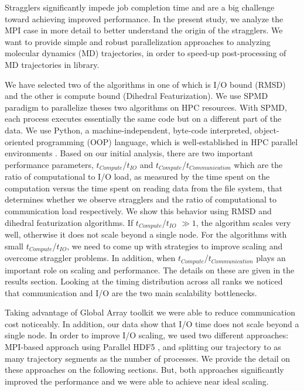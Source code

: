 Stragglers significantly impede job completion time and are a big challenge toward achieving improved performance.
In the present study, we analyze the MPI case in more detail to better understand the origin of the stragglers.
We want to provide simple and robust parallelization approaches to analyzing molecular dynamics (MD) trajectories, in order to speed-up post-processing of MD trajectories in  library. 

We have selected two of the algorithms in  one of which is I/O bound (RMSD) and the other is compute bound (Dihedral Featurization).
We use SPMD paradigm to parallelize theses two algorithms on HPC resources.
With SPMD, each process executes essentially the same code but on a different part of the data. 
We use Python, a machine-independent, byte-code interpreted, object-oriented programming (OOP) language, which is well-established in HPC parallel environments \cite{GAiN}. 
Based on our initial analysis, there are two important performance parameters,  $t_{Compute}$/$t_{IO}$ and $t_{Compute}$/$t_{Communication}$ which are the ratio of computational to I/O load, as measured by the time spent on the computation versus the time spent on reading data from the file system, that determines whether we observe stragglers and the ratio of computational to communication load respectively.
We show this behavior using RMSD and dihedral featurization algorithms.
If $t_{Compute}$/$t_{IO}$  $\gg 1$, the algorithm scales very well, otherwise it does not scale beyond a single node.  
For the algorithms with small $t_{Compute}$/$t_{IO}$, we need to come up with strategies to improve scaling and overcome straggler problems.
In addition, when $t_{Compute}$/$t_{Communication}$ plays an important role on scaling and performance. 
The details on these are given in the results section. 
Looking at the timing distribution across all ranks we noticed that communication and I/O are the two main scalability bottlenecks.

Taking advantage of Global Array toolkit we were able to reduce communication cost noticeably.
In addition, our data show that I/O time does not scale beyond a single node. 
In order to improve I/O scaling, we used two different approaches: MPI-based approach using Parallel HDF5 \cite{pythonhdf5}, and splitting our trajectory to as many trajectory segments as the number of processes. 
We provide the detail on these approaches on the following sections.
But, both approaches significantly improved the performance and we were able to achieve near ideal scaling.